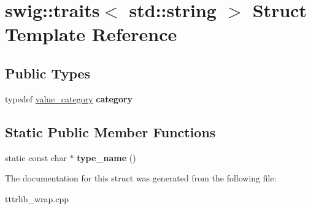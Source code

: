 \hypertarget{structswig_1_1traits_3_01std_1_1string_01_4}{}\section{swig\+:\+:traits$<$ std\+:\+:string $>$ Struct Template Reference}
\label{structswig_1_1traits_3_01std_1_1string_01_4}
\subsection*{Public Types}
\begin{DoxyCompactItemize}
\item 
\mbox{\label{structswig_1_1traits_3_01std_1_1string_01_4_aec31e973b1220342e0b89c6b8fe96684}} 
typedef \hyperlink{structswig_1_1value__category}{value\+\_\+category} {\bfseries category}
\end{DoxyCompactItemize}
\subsection*{Static Public Member Functions}
\begin{DoxyCompactItemize}
\item 
\mbox{\label{structswig_1_1traits_3_01std_1_1string_01_4_ab4142e71b21ccbad9a8161a116f660d2}} 
static const char $\ast$ {\bfseries type\+\_\+name} ()
\end{DoxyCompactItemize}


The documentation for this struct was generated from the following file\+:\begin{DoxyCompactItemize}
\item 
tttrlib\+\_\+wrap.\+cpp\end{DoxyCompactItemize}
